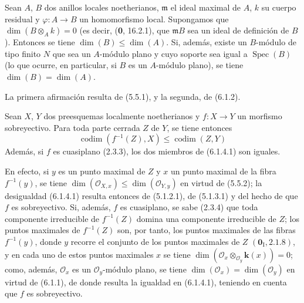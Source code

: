 \begin{corollary}[6.1.3]
Sean $A$, $B$ dos anillos locales noetherianos, $\mathfrak m$ el ideal maximal
de $A$, $k$ su cuerpo residual y $\varphi:A\to B$ un homomorfismo local.
Supongamos que $\dim(B\otimes_Ak)=0$ \textup{(es decir, (\textbf{0}, 16.2.1), que
$\mathfrak mB$ sea un} ideal de definición \textup{de $B$)}. Entonces se tiene
$\dim(B)\leq\dim(A)$. Si, además, existe un $B$-módulo de tipo finito $N$ que
sea un $A$-módulo plano y cuyo soporte sea igual a $\operatorname{Spec}(B)$
\textup{(lo que ocurre, en particular, si $B$ es un $A$-módulo} plano), se tiene
$\dim(B)=\dim(A)$.
\end{corollary}

La primera afirmación resulta de (5.5.1), y la segunda, de (6.1.2).

\begin{corollary}[6.1.4]
\label{IV.2.s6.1.4-fr}
Sean $X$, $Y$ dos preesquemas localmente noetherianos y $f:X\to Y$ un
morfismo sobreyectivo. Para toda parte cerrada $Z$ de $Y$, se tiene entonces
\begin{equation}
\operatorname{codim}(f^{-1}(Z),X)\leq\operatorname{codim}(Z,Y)
\tag{6.1.4.1}\label{IV.2.s6.1.4.1-fr}
\end{equation}
Además, si $f$ es cuasiplano \textup{(2.3.3)}, los dos miembros de \textup{(6.1.4.1)} son
iguales.
\end{corollary}

En efecto, si $y$ es un punto maximal de $Z$ y $x$ un punto maximal de la
fibra $f^{-1}(y)$, se tiene
$\dim(\mathcal O_{X,x})\leq\dim(\mathcal O_{Y,y})$ en virtud de (5.5.2);
la desigualdad (6.1.4.1) resulta entonces de (5.1.2.1), de (5.1.3.1) y del
hecho de que $f$ es sobreyectivo. Si, además, $f$ es cuasiplano, se sabe
(2.3.4) que toda componente irreducible de $f^{-1}(Z)$ domina una componente
irreducible de $Z$; los puntos maximales de $f^{-1}(Z)$ son, por tanto, los
puntos maximales de las fibras $f^{-1}(y)$, donde $y$ recorre el conjunto de
los puntos maximales de $Z$ $(\mathbf{0}_{\mathrm I}, 2.1.8)$, y en cada uno de estos
puntos maximales $x$ se tiene
$\dim(\mathcal O_x\otimes_{\mathcal O_y}\boldsymbol{k}(x))=0$; como, además,
$\mathcal O_x$ es un $\mathcal O_y$-módulo plano, se tiene
$\dim(\mathcal O_x)=\dim(\mathcal O_y)$ en virtud de (6.1.1), de donde
resulta la igualdad en (6.1.4.1), teniendo en cuenta que $f$ es sobreyectivo.
